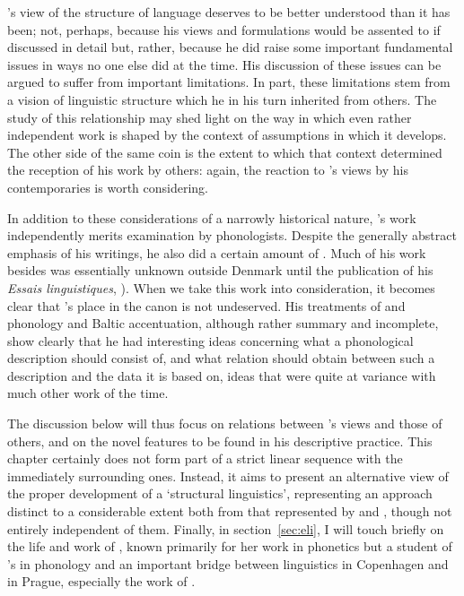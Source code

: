 {\Hjelmslev}'s view of the structure of language deserves to be better
understood than it has been; not, perhaps, because his views and
formulations would be assented to if discussed in detail but, rather,
because he did raise some important fundamental issues in ways no one
else did at the time. His discussion of these issues can be argued to
suffer from important limitations. In part, these limitations stem
from a vision of linguistic structure which he in his turn inherited
from others. The study of this relationship may shed light on the way
in which even rather independent work is shaped by the context of
assumptions in which it develops. The other side of the same coin is
the extent to which that context determined the reception of his work
by others: again, the reaction to {\Hjelmslev}'s views by his
contemporaries is worth considering.

In addition to these considerations of a narrowly historical nature,
{\Hjelmslev}'s work independently merits examination by
phonologists. Despite the generally abstract emphasis of his writings,
he also did a certain amount of .  Much of his
work besides \citet{hjelmslev43:prolegomena} was essentially unknown
outside Denmark until the publication of his \textsl{Essais
  linguistiques},
\citet{hjelmslev59:essais.1,hjelmslev73:essais.2,hjelmslev85:nouveaux.essais}).
When we take this work into consideration, it becomes clear that
{\Hjelmslev}'s place in the canon is not undeserved.  His treatments of
 and  phonology and Baltic accentuation, although rather
summary and incomplete, show clearly that he had interesting ideas
concerning what a phonological description should consist of, and what
relation should obtain between such a description and the data it is
based on, ideas that were quite at variance with much other work of
the time.

The discussion below will thus focus on relations between {\Hjelmslev}'s
views and those of others, and on the novel features to be found in
his descriptive practice. This chapter certainly does not form part of
a strict linear sequence with the immediately surrounding
ones. Instead, it aims to present an alternative view of the proper
development of a `structural linguistics', representing an approach
distinct to a considerable extent both from that represented by
{\Trubetzkoy} and {\Jakobson}, though not entirely independent of
them. Finally, in section~\ref{sec:eli}, I will touch briefly on the life and
work of , known primarily for her work in
phonetics but a student of {\Hjelmslev}'s in phonology and an important
bridge between linguistics in Copenhagen and in Prague, especially the
work of {\Jakobson}.

